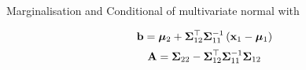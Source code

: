 \documentclass{beamer}
\begin{document}
\begin{frame}{Marginalisation and Conditional of multivariate normal}
	with
	
	$$\mathbf{b}=\boldsymbol{\mu}_{2}+\boldsymbol{\Sigma}_{12}^\top \boldsymbol{\Sigma}_{11}^{-1}\left(\mathbf{x}_{1}-\boldsymbol{\mu}_{1}\right)$$
	\[
	\mathbf{A}=\boldsymbol{\Sigma}_{22}-\boldsymbol{\Sigma}_{12}^\top \boldsymbol{\Sigma}_{11}^{-1} \boldsymbol{\Sigma}_{12}
	\]
\end{frame}


%
%
\end{document}
